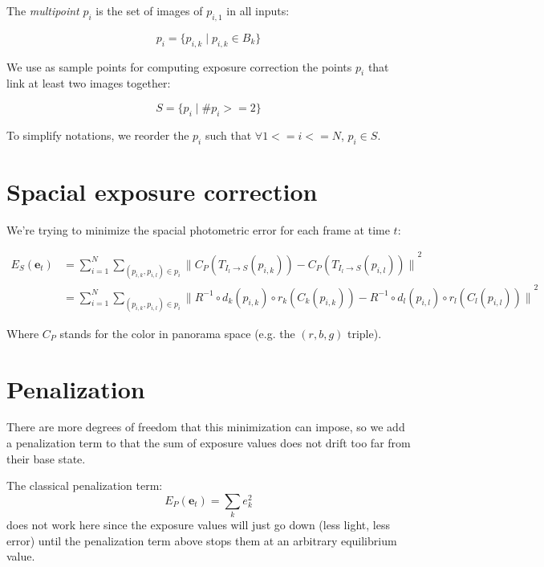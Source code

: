 \documentclass{article}
\begin{document}
The {\em multipoint} $p_i$ is the set of images of $p_{i,1}$ in all inputs:

\begin{equation}
  p_i = \{p_{i,k} \mid  p_{i,k} \in B_k\}
\end{equation}

We use as sample points for computing exposure correction the points $p_i$ that link at least two images together:

\begin{equation}
  S = \{p_i \mid \#p_i >= 2\}
\end{equation}

To simplify notations, we reorder the $p_i$ such that $\forall 1 <= i <= N$, $p_i \in S$.


\section{Spacial exposure correction}

We're trying to minimize the spacial photometric error for each frame at time $t$:

\begin{align}
  E_S(\mathbf{e}_t) &= \sum_{i=1}^{N}{ \sum_{(p_{i,k}, p_{i,l}) \in p_i} { {\| C_P(T_{I_l \rightarrow S}(p_{i,k})) - C_P(T_{I_l \rightarrow S}(p_{i,l})) \|}^2 } } \\
                  &= \sum_{i=1}^{N}{ \sum_{(p_{i,k}, p_{i,l}) \in p_i} { {\| R^{-1} \circ d_k(p_{i,k}) \circ r_k (C_k(p_{i,k})) - R^{-1} \circ d_l(p_{i,l}) \circ r_l (C_l(p_{i,l})) \|}^2 } }
\end{align}

Where $C_P$ stands for the color in panorama space (e.g. the $(r, b, g)$ triple).

\section{Penalization}

There are more degrees of freedom that this minimization can impose, so we add a penalization term to that the sum of exposure values does not drift too far from their base state.

The classical penalization term:
\begin{equation}
  E_P(\mathbf{e}_t) = \sum_k{e_k^2}
\end{equation}
does not work here since the exposure values will just go down (less light, less error) until the penalization term above stops them at an arbitrary equilibrium value.
\end{document}
